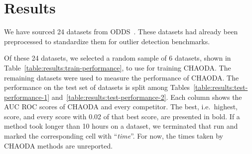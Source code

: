 \section{Results}
\label{sec:results}

We have sourced 24 datasets from ODDS~\cite{rayana2016odds}.
These datasets had already been preprocessed to standardize them for outlier detection benchmarks.

Of these 24 datasets, we selected a random sample of 6 datasets, shown in Table~\ref{table:results:train-performance}, to use for training CHAODA\@.
The remaining datasets were used to measure the performance of CHAODA\@.
The performance on the test set of datasets is split among Tables~\ref{table:results:test-performance-1} and~\ref{table:results:test-performance-2}.
Each column shows the AUC ROC scores of CHAODA and every competitor.
The best, i.e.\ highest, score, and every score with 0.02 of that best score, are presented in bold.
If a method took longer than 10 hours on a dataset, we terminated that run and marked the corresponding cell with ``\textit{time}''.
For now, the times taken by CHAODA methods are unreported.




